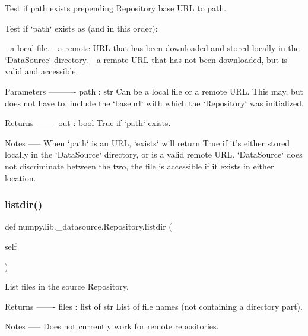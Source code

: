 \begin{DoxyVerb}Test if path exists prepending Repository base URL to path.

Test if `path` exists as (and in this order):

- a local file.
- a remote URL that has been downloaded and stored locally in the
  `DataSource` directory.
- a remote URL that has not been downloaded, but is valid and
  accessible.

Parameters
----------
path : str
    Can be a local file or a remote URL. This may, but does not
    have to, include the `baseurl` with which the `Repository` was
    initialized.

Returns
-------
out : bool
    True if `path` exists.

Notes
-----
When `path` is an URL, `exists` will return True if it's either
stored locally in the `DataSource` directory, or is a valid remote
URL.  `DataSource` does not discriminate between the two, the file
is accessible if it exists in either location.\end{DoxyVerb}
 \mbox{\label{classnumpy_1_1lib_1_1__datasource_1_1Repository_a5712ee37b741dedc92dc0e45490cf982}} 
\subsubsection{\texorpdfstring{listdir()}{listdir()}}
{\footnotesize\ttfamily def numpy.\+lib.\+\_\+datasource.\+Repository.\+listdir (\begin{DoxyParamCaption}\item[{}]{self }\end{DoxyParamCaption})}

\begin{DoxyVerb}List files in the source Repository.

Returns
-------
files : list of str
    List of file names (not containing a directory part).

Notes
-----
Does not currently work for remote repositories.\end{DoxyVerb}
 \mbox{\label{classnumpy_1_1lib_1_1__datasource_1_1Repository_a3bc743780b0bc4148dca0dbf5f3d7f18}} 
